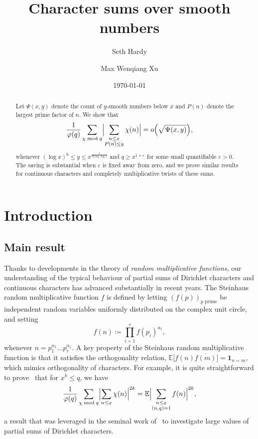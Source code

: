 \documentclass[a4paper,12pt,reqno]{amsart}
\newcommand{\E}{\mathbb{E}}
\begin{document}
\title{Character sums over smooth numbers}
\author{Seth Hardy}
\address{Mathematics Institute, Zeeman Building, University of Warwick, Coventry CV4 7AL, England}
\author{Max Wenqiang Xu} 
\address{Yau Mathematical Sciences Center, Tsinghua University, Beijing, China}
\date{\today} 
\begin{abstract}
Let $\Psi (x,y)$ denote the count of $y$-smooth numbers below $x$ and $P(n)$ denote the largest prime factor of $n$. We show that
\[
\frac{1}{\varphi(q)} \sum_{\chi \bmod q} \Bigl| \sum_{\substack{n \leq x \\ P(n) \leq y}} \chi(n) \Bigr| = o \Bigl( \sqrt{\Psi(x,y)} \Bigr),
\]
whenever $(\log x)^6 \leq y \leq x^{\frac{1}{32 \log \log x}}$ and $q \geq x^{1 + \varepsilon}$ for some small quantifiable $\varepsilon > 0$. The saving is substantial when $\varepsilon$ is fixed away from zero, and we prove similar results for continuous characters and completely multiplicative twists of these sums.
\end{abstract}
\maketitle

\section{Introduction}

\subsection{Main result}
Thanks to developments in the theory of \emph{random multiplicative functions}, our understanding of the typical behaviour of partial sums of Dirichlet characters and continuous characters has advanced substantially in recent years. The Steinhaus random multiplicative function $f$ is defined by letting $(f(p))_{p \text{ prime}}$ be independent random variables uniformly distributed on the complex unit circle, and setting
\[
f(n) \coloneqq \prod_{i=1}^r f(p_i)^{\alpha_i},
\]
whenever $n = p_1^{\alpha_1} \dots p_r^{\alpha_r}$. A key property of the Steinhaus random multiplicative function is that it satisfies the orthogonality relation, $\E \bigl[ f(n) \overline{f(m)} \bigr] = \mathbf{1}_{n=m}$, which mimics orthogonality of characters. For example, it is quite straightforward to prove~\cite[Lemma 2.1]{GranvilleSound} that for $x^k \leq q$, we have
\[
\frac{1}{\varphi(q)} \sum_{\chi \bmod q} \Bigl| \sum_{n \leq x} \chi (n) \Bigr|^{2k} = \E \Bigl| \sum_{\substack{n \leq x \\ (n,q)=1}} f(n) \Bigr|^{2k},
\]
a result that was leveraged in the seminal work of~\citet{GranvilleSound} to investigate large values of partial sums of Dirichlet characters.
\end{document}
